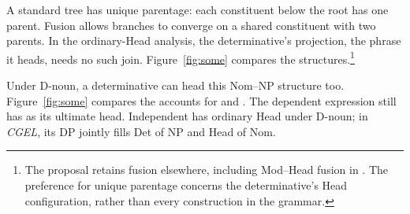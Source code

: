 \documentclass[12pt]{article}
\begin{document}
A standard tree has unique parentage: each constituent below the root has one parent. Fusion allows branches to converge on a shared constituent with two parents. In the ordinary-Head analysis, the determinative's projection, the phrase it heads, needs no such join. Figure~\ref{fig:some} compares the structures.\footnote{The proposal retains fusion elsewhere, including Mod--Head fusion in . The preference for unique parentage concerns the determinative's Head configuration, rather than every construction in the grammar.}

Under D-noun, a determinative can head this Nom--NP structure too. Figure~\ref{fig:some} compares the accounts for  and . The dependent expression still has  as its ultimate head. Independent  has ordinary Head under D-noun; in \textit{CGEL}, its DP jointly fills Det of NP and Head of Nom.
\end{document}
